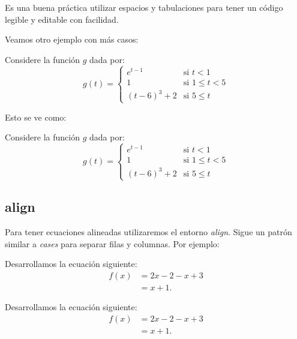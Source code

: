 \documentclass[graybox,envcountchap,sectrefs]{svmono}
\begin{document}
Es una buena práctica utilizar espacios y tabulaciones para tener un código legible y editable con facilidad.


Veamos otro ejemplo con más casos:
\begin{code}
    Considere la función \(g\) dada por:
    \[g(t) =    \begin{cases}
                    e^{t-1}     & \text{si } t < 1 \\
                    1           & \text{si } 1 \leq t < 5 \\
                    (t-6)^3+2   & \text{si } 5 \leq t
                \end{cases}
    \]
\end{code}
Esto se ve como:
\begin{compiled}
    Considere la función \(g\) dada por:
    \[g(t) =    \begin{cases}
                    e^{t-1}     & \text{si } t < 1 \\
                    1           & \text{si } 1 \leq t < 5 \\
                    (t-6)^3+2   & \text{si } 5 \leq t
                \end{cases}
            \]
\end{compiled}
\subsection{align} %
    Para tener ecuaciones alineadas utilizaremos el entorno \emph{align}.
    Sigue un patrón similar a \emph{cases} para separar filas y columnas. Por ejemplo:
    \begin{code}
        Desarrollamos la ecuación siguiente:
        \begin{align}
            f(x)    & = 2x-2-x+3  \\
                    & = x+1.
        \end{align}
    \end{code}
    \begin{compiled}
        Desarrollamos la ecuación siguiente:
        \begin{align}
            f(x)    & = 2x-2-x+3  \\
                    & = x+1.
        \end{align}
    \end{compiled}
\end{document}
